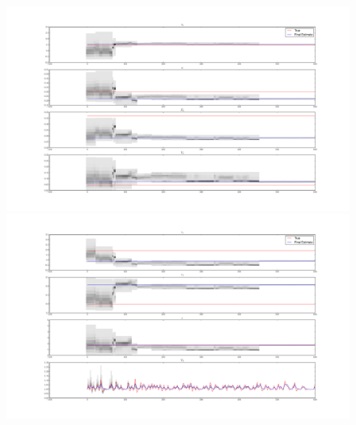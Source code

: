 \begin{figure}[H]
\subfigure
{\includegraphics[clip=true,trim=6cm 2cm 6cm 3cm, width=\textwidth]{images/highnoise_run6_1}}
\subfigure
{\includegraphics[clip=true,trim=6cm 2cm 6cm 3cm, width=\textwidth]{images/highnoise_run6_2}}
\end{figure}

